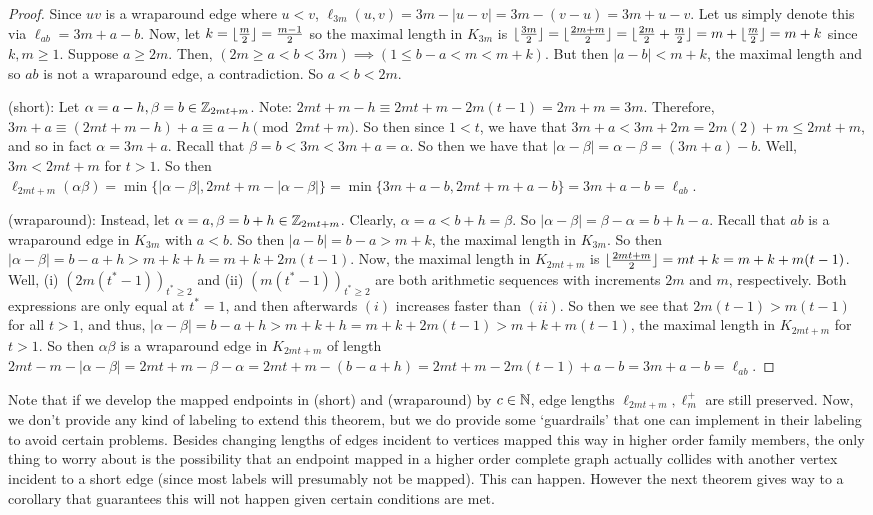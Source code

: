 \begin{proof}
Since $uv$ is a wraparound edge where $u<v$, $\ell_{3m}(u,v)=3m-|u-v|=3m-(v-u)=3m+u-v$. Let us simply denote this via $\ell_{ab}=3m+a-b$. Now, let $k=\lfloor\frac{m}{2}\rfloor=\frac{m-1}{2}$ so the maximal length in $K_{3m}$ is $\lfloor\frac{3m}{2}\rfloor=\lfloor\frac{2m+m}{2}\rfloor=\lfloor\frac{2m}{2}+\frac{m}{2}\rfloor=m+\lfloor\frac{m}{2}\rfloor=m+k$ since $k,m\geq 1$. Suppose $a\geq 2m$. Then, $(2m\geq a<b<3m)\implies (1\leq b-a<m<m+k).$ But then $|a-b|<m+k$, the maximal length and so $ab$ is not a wraparound edge, a contradiction. So $a<b<2m$.\newline

\noindent (short): Let $\alpha= a-h,\beta=b\in \mathbb{Z}_{2mt+m}$. Note: $2mt+m-h\equiv 2mt+m-2m(t-1)=2m+m=3m$. Therefore, $3m+a\equiv (2mt+m-h)+a\equiv a-h \pmod{2mt+m}$. So then since $1<t$, we have that $3m+a<3m+2m=2m(2)+m\leq 2mt+m$, and so in fact $\alpha = 3m+a$. Recall that $\beta=b<3m<3m+a=\alpha$. So then we have that $|\alpha-\beta|=\alpha-\beta=(3m+a)-b$. Well, $3m<2mt+m$ for $t>1$. So then $\ell_{2mt+m}(\alpha\beta)=\min\{|\alpha-\beta|,2mt+m-|\alpha-\beta|\}=\min\{3m+a-b, 2mt+m+a-b\}=3m+a-b=\ell_{ab}$.\newline

\noindent (wraparound): Instead, let $\alpha =a,\beta=b+h\in \mathbb{Z}_{2mt+m}$. Clearly, $\alpha=a<b+h=\beta$. So $|\alpha-\beta|=\beta-\alpha=b+h-a$. Recall that $ab$ is a wraparound edge in $K_{3m}$ with $a<b$. So then $|a-b|=b-a>m+k$, the maximal length in $K_{3m}$. So then $|\alpha-\beta|=b-a+h>m+k+h=m+k+2m(t-1)$. Now, the maximal length in $K_{2mt+m}$ is $\lfloor\frac{2mt+m}{2}\rfloor=mt+k=m+k+m(t-1)$. Well, (i) $(2m(t^{*}-1))_{t^{*}\geq 2}$ and (ii) $(m(t^{*}-1))_{t^{*}\geq 2}$ are both arithmetic sequences with increments $2m$ and $m$, respectively. Both expressions are only equal at $t^{*}=1$, and then afterwards $(i)$ increases faster than $(ii)$. So then we see that $2m(t-1)>m(t-1)$ for all $t>1$, and thus, $|\alpha-\beta|=b-a+h>m+k+h=m+k+2m(t-1)>m+k+m(t-1)$, the maximal length in $K_{2mt+m}$ for $t>1$. So then $\alpha\beta$ is a wraparound edge in $K_{2mt+m}$ of length $2mt-m-|\alpha-\beta|=2mt+m-\beta-\alpha=2mt+m - (b-a+h)= 2mt+m-2m(t-1)+a-b=3m+a-b=\ell_{ab}$.

\end{proof}
Note that if we develop the mapped endpoints in (short) and (wraparound) by $c\in \mathbb{N}$, edge lengths $\ell_{2mt+m},\ell_{m}^{+}$ are still preserved. Now, we don't provide any kind of labeling to extend this theorem, but we do provide some `guardrails' that one can implement in their labeling to avoid certain problems. Besides changing lengths of edges incident to vertices mapped this way in higher order family members, the only thing to worry about is the possibility that an endpoint mapped in a higher order complete graph actually collides with another vertex incident to a short edge (since most labels will presumably not be mapped). This can happen. However the next theorem gives way to a corollary that guarantees this will not happen given certain conditions are met.\newline
